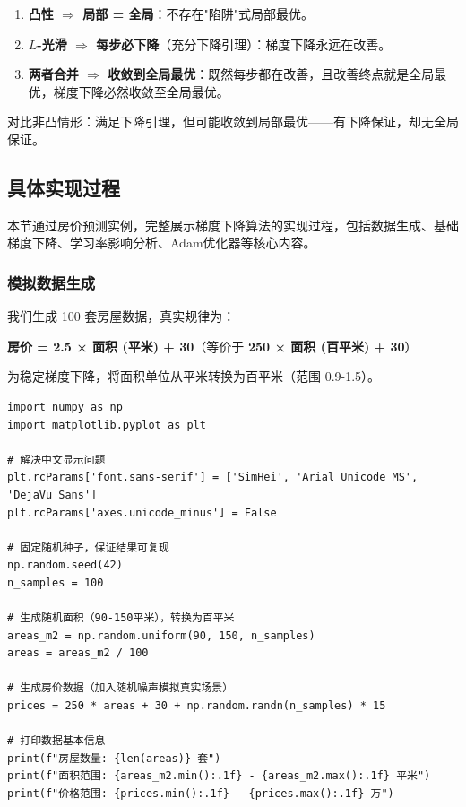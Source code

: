 \documentclass[10pt]{article}
\numberwithin{equation}{section}
\theoremstyle{plain}
\theoremstyle{definition}
\theoremstyle{remark}
\begin{document}
\begin{RemarkBox}[核心逻辑链]
	\begin{enumerate}
		\item \textbf{凸性 $\Rightarrow$ 局部 = 全局}：不存在"陷阱"式局部最优。
		\item \textbf{$L$-光滑 $\Rightarrow$ 每步必下降}（充分下降引理）：梯度下降永远在改善。
		\item \textbf{两者合并 $\Rightarrow$ 收敛到全局最优}：既然每步都在改善，且改善终点就是全局最优，梯度下降必然收敛至全局最优。
	\end{enumerate}

	对比非凸情形：满足下降引理，但可能收敛到局部最优——有下降保证，却无全局保证。
\end{RemarkBox}

\subsection{具体实现过程}

本节通过房价预测实例，完整展示梯度下降算法的实现过程，包括数据生成、基础梯度下降、学习率影响分析、Adam优化器等核心内容。

\subsubsection{模拟数据生成}

我们生成 100 套房屋数据，真实规律为：

\textbf{房价 = 2.5 × 面积 (平米) + 30}（等价于 \textbf{250 × 面积 (百平米) + 30}）

为稳定梯度下降，将面积单位从平米转换为百平米（范围 0.9-1.5）。

\begin{CodeBox}
	\begin{lstlisting}[style=PythonStyle]
import numpy as np
import matplotlib.pyplot as plt

# 解决中文显示问题
plt.rcParams['font.sans-serif'] = ['SimHei', 'Arial Unicode MS', 'DejaVu Sans']
plt.rcParams['axes.unicode_minus'] = False

# 固定随机种子，保证结果可复现
np.random.seed(42)
n_samples = 100

# 生成随机面积（90-150平米），转换为百平米
areas_m2 = np.random.uniform(90, 150, n_samples)
areas = areas_m2 / 100

# 生成房价数据（加入随机噪声模拟真实场景）
prices = 250 * areas + 30 + np.random.randn(n_samples) * 15

# 打印数据基本信息
print(f"房屋数量: {len(areas)} 套")
print(f"面积范围: {areas_m2.min():.1f} - {areas_m2.max():.1f} 平米")
print(f"价格范围: {prices.min():.1f} - {prices.max():.1f} 万")
\end{lstlisting}
\end{CodeBox}
\end{document}
